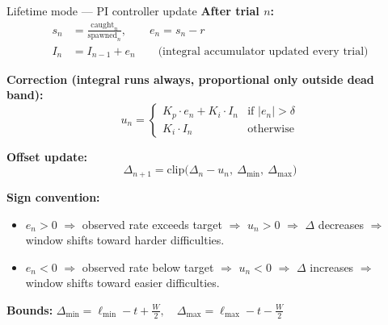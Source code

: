 \documentclass[10pt,aspectratio=169]{beamer}
\newcommand{\target}{r}
\newcommand{\obs}{s_n}
\newcommand{\err}{e_n}
\newcommand{\Kp}{K_p}
\newcommand{\Ki}{K_i}
\newcommand{\Iaccum}{I_n}
\newcommand{\dband}{\delta}
\begin{document}
\begin{frame}{Lifetime mode --- PI controller update}
\textbf{After trial $n$:}
\begin{align*}
\obs &= \frac{\text{caught}_n}{\text{spawned}_n}, \qquad \err = \obs - \target \\[3pt]
\Iaccum &= I_{n-1} + \err \qquad \text{(integral accumulator updated every trial)}
\end{align*}

\textbf{Correction (integral runs always, proportional only outside dead band):}
\[
u_n =
\begin{cases}
\Kp \cdot \err + \Ki \cdot \Iaccum & \text{if } |\err| > \dband \\[4pt]
\Ki \cdot \Iaccum & \text{otherwise}
\end{cases}
\]

\textbf{Offset update:}
\[
\Delta_{n+1} = \mathrm{clip}\bigl(\Delta_n - u_n,\ \Delta_{\min},\ \Delta_{\max}\bigr)
\]

\textbf{Sign convention:}
\begin{itemize}
    \item $\err > 0$ $\Rightarrow$ observed rate exceeds target $\Rightarrow$ $u_n > 0$ $\Rightarrow$ $\Delta$ decreases $\Rightarrow$ window shifts toward harder difficulties.
    \item $\err < 0$ $\Rightarrow$ observed rate below target $\Rightarrow$ $u_n < 0$ $\Rightarrow$ $\Delta$ increases $\Rightarrow$ window shifts toward easier difficulties.
\end{itemize}

\textbf{Bounds:} $\Delta_{\min} = \ell_{\min} - t + \tfrac{W}{2}, \quad \Delta_{\max} = \ell_{\max} - t - \tfrac{W}{2}$
\end{frame}
\end{document}
